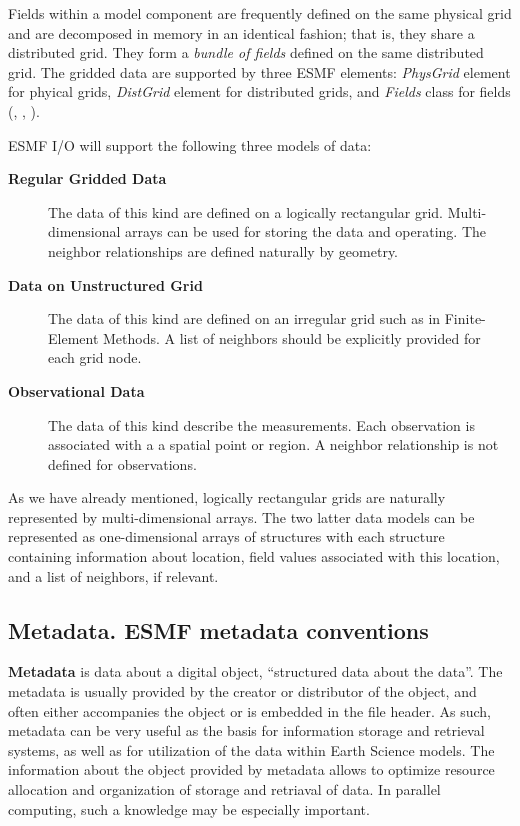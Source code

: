 Fields within a model component are frequently defined on the same
physical grid and are decomposed in memory in an identical fashion;
that is, they share a distributed grid. They form a {\em bundle of
fields} defined on the same distributed grid. The gridded data are
supported by three ESMF elements: {\em PhysGrid} element 
for phyical grids, {\em DistGrid} element for distributed grids, and 
{\em Fields} class for fields (\cite{ESMF-PhysGrid-Req},
\cite{ESMF-DistGrid-Req}, \cite{ESMF-Field-Req}). 

ESMF I/O will support the following three models of data: 
\begin{description}
\item[\bf Regular Gridded Data] The data of this kind are defined on a
logically rectangular grid. Multi-dimensional arrays can be used for
storing the data and operating. The neighbor relationships are defined
naturally by geometry.

\item[\bf Data on Unstructured Grid] The data of this kind are defined on an 
irregular grid such as in Finite-Element Methods. A list of neighbors should 
be explicitly provided for each grid node. 

\item[\bf Observational Data] The data of this kind describe the 
measurements. Each observation is associated with a a spatial point or region.
A neighbor relationship is not defined for observations. 
\end{description}

As we have already mentioned, logically rectangular grids are naturally 
represented by multi-dimensional arrays. The two latter data models can be 
represented as one-dimensional arrays of structures with each structure 
containing information about location, field values associated with this 
location, and a list of neighbors, if relevant. 

\subsection{Metadata. ESMF metadata conventions}

{\bf Metadata} is data about a digital object, ``structured data about the 
data''. The metadata is usually provided by the creator or distributor of 
the object, and often either accompanies the object or is embedded in the 
file header. As such, metadata can be very useful as the basis for 
information storage and retrieval systems, as well as for utilization of the 
data within Earth Science models.
The information about the object provided by metadata allows to optimize  
resource allocation and organization of storage and retriaval of data. In 
parallel computing, such a knowledge may be especially important. 

